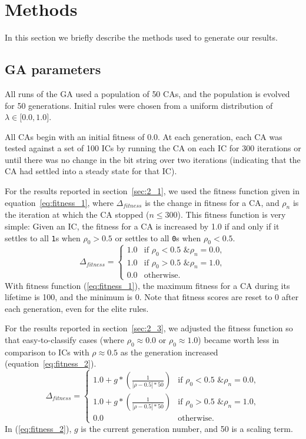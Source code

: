 
\section{Methods} \label{sec:methods}

In this section we briefly describe the methods used to generate our results.

\subsection{GA parameters}

All runs of the GA used a population of 50 CAs, and the population is evolved for 50 generations. 
Initial rules were chosen from a uniform distribution of $\lambda \in \lbrack0.0, 1.0\rbrack$.

All CAs begin with an initial fitness of 0.0. At each generation, each CA was tested against a set of 100 ICs by 
running the CA on each IC for 300 iterations or until there was no change in the bit string over two iterations (indicating that 
the CA had settled into a steady state for that IC). 

For the results reported in section~\ref{sec:2_1}, we used the fitness function given in equation~\ref{eq:fitness_1}, where 
$\Delta_{fitness}$ is the change in fitness for a CA, and $\rho_n$ is the iteration at which the CA stopped ($n \leq 300$). This fitness 
function is very simple: Given an IC, the fitness for a CA is increased by 1.0 if and only if it settles to all \texttt{1}s when $\rho_0 > 0.5$ or 
settles to all \texttt{0}s when $\rho_0 < 0.5$.
\begin{equation} \label{eq:fitness_1}
  \Delta_{fitness} =
  \begin{cases}
    1.0 & \text{if } \rho_0 < 0.5 \text{ \& } \rho_n = 0.0,
    \\
    1.0 & \text{if } \rho_0 > 0.5 \text{ \& } \rho_n = 1.0,
   \\
    0.0 & \text{otherwise}.
  \end{cases}
\end{equation}
With fitness function (\ref{eq:fitness_1}), the maximum fitness for a CA during its lifetime is 100, and the minimum is 0. Note that fitness 
scores are reset to 0 after each generation, even for the elite rules.

For the results reported in section~\ref{sec:2_3}, we adjusted the fitness function so that easy-to-classify cases (where 
$\rho_0 \approx 0.0$ or $\rho_0 \approx 1.0$) became worth less in comparison to ICs with $\rho \approx 0.5$ as the generation 
increased (equation~\ref{eq:fitness_2}).
\begin{equation} \label{eq:fitness_2}
  \Delta_{fitness} =
  \begin{cases}
    1.0 + g*(\frac{1}{|\rho - 0.5| * 50}) & \text{if } \rho_0 < 0.5 \text{ \& } \rho_n = 0.0,
    \\
    1.0 + g*(\frac{1}{|\rho - 0.5| * 50})& \text{if } \rho_0 > 0.5 \text{ \& } \rho_n = 1.0,
   \\
    0.0 & \text{otherwise}.
  \end{cases}
\end{equation}
In (\ref{eq:fitness_2}), $g$ is the current generation number, and 50 is a scaling term.

